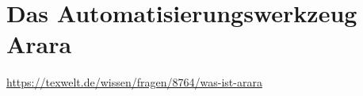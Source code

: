 \chapter{Das Automatisierungswerkzeug Arara}

\url{https://texwelt.de/wissen/fragen/8764/was-ist-arara}